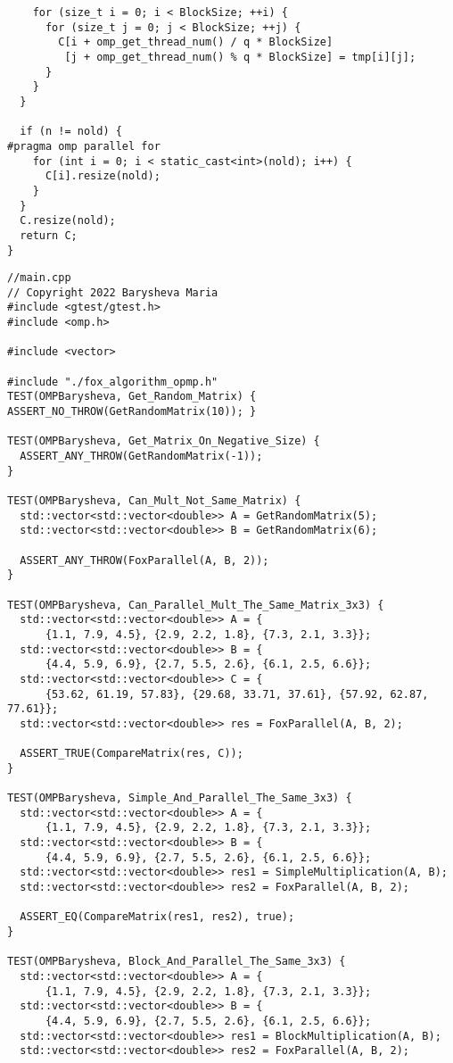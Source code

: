 \documentclass[12pt]{article}
\begin{document}
\begin{lstlisting}
    for (size_t i = 0; i < BlockSize; ++i) {
      for (size_t j = 0; j < BlockSize; ++j) {
        C[i + omp_get_thread_num() / q * BlockSize]
         [j + omp_get_thread_num() % q * BlockSize] = tmp[i][j];
      }
    }
  }

  if (n != nold) {
#pragma omp parallel for
    for (int i = 0; i < static_cast<int>(nold); i++) {
      C[i].resize(nold);
    }
  }
  C.resize(nold);
  return C;
}
\end{lstlisting}
\begin{lstlisting}
//main.cpp
// Copyright 2022 Barysheva Maria
#include <gtest/gtest.h>
#include <omp.h>

#include <vector>

#include "./fox_algorithm_opmp.h"
TEST(OMPBarysheva, Get_Random_Matrix) { ASSERT_NO_THROW(GetRandomMatrix(10)); }

TEST(OMPBarysheva, Get_Matrix_On_Negative_Size) {
  ASSERT_ANY_THROW(GetRandomMatrix(-1));
}

TEST(OMPBarysheva, Can_Mult_Not_Same_Matrix) {
  std::vector<std::vector<double>> A = GetRandomMatrix(5);
  std::vector<std::vector<double>> B = GetRandomMatrix(6);

  ASSERT_ANY_THROW(FoxParallel(A, B, 2));
}

TEST(OMPBarysheva, Can_Parallel_Mult_The_Same_Matrix_3x3) {
  std::vector<std::vector<double>> A = {
      {1.1, 7.9, 4.5}, {2.9, 2.2, 1.8}, {7.3, 2.1, 3.3}};
  std::vector<std::vector<double>> B = {
      {4.4, 5.9, 6.9}, {2.7, 5.5, 2.6}, {6.1, 2.5, 6.6}};
  std::vector<std::vector<double>> C = {
      {53.62, 61.19, 57.83}, {29.68, 33.71, 37.61}, {57.92, 62.87, 77.61}};
  std::vector<std::vector<double>> res = FoxParallel(A, B, 2);

  ASSERT_TRUE(CompareMatrix(res, C));
}

TEST(OMPBarysheva, Simple_And_Parallel_The_Same_3x3) {
  std::vector<std::vector<double>> A = {
      {1.1, 7.9, 4.5}, {2.9, 2.2, 1.8}, {7.3, 2.1, 3.3}};
  std::vector<std::vector<double>> B = {
      {4.4, 5.9, 6.9}, {2.7, 5.5, 2.6}, {6.1, 2.5, 6.6}};
  std::vector<std::vector<double>> res1 = SimpleMultiplication(A, B);
  std::vector<std::vector<double>> res2 = FoxParallel(A, B, 2);

  ASSERT_EQ(CompareMatrix(res1, res2), true);
}

TEST(OMPBarysheva, Block_And_Parallel_The_Same_3x3) {
  std::vector<std::vector<double>> A = {
      {1.1, 7.9, 4.5}, {2.9, 2.2, 1.8}, {7.3, 2.1, 3.3}};
  std::vector<std::vector<double>> B = {
      {4.4, 5.9, 6.9}, {2.7, 5.5, 2.6}, {6.1, 2.5, 6.6}};
  std::vector<std::vector<double>> res1 = BlockMultiplication(A, B);
  std::vector<std::vector<double>> res2 = FoxParallel(A, B, 2);


\end{lstlisting}
\end{document}
